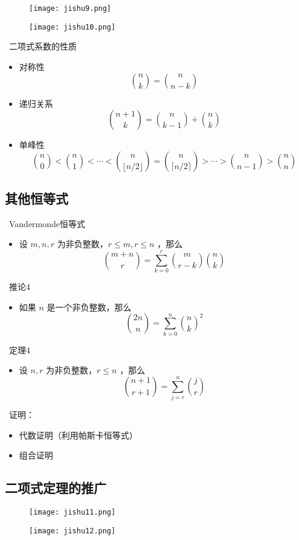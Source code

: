 \documentclass[UTF8]{report}
\theoremstyle{MyLineTheoremStyle} %
\theoremstyle{MyBlockTheoremStyle} %
\theoremstyle{MySubsubsectionStyle} %
\begin{document}
\begin{figure}[H]
    \centering
    \texttt{[image: jishu9.png]}
\end{figure}

\begin{figure}[H]
    \centering
    \texttt{[image: jishu10.png]}
\end{figure}

\textbullet\ 二项式系数的性质
\begin{itemize}
    \item 对称性
    \[
    \binom{n}{k} = \binom{n}{n - k}
    \]
    \item 递归关系
    \[
    \binom{n+1}{k} = \binom{n}{k-1} + \binom{n}{k}
    \]
    \item 单峰性
    \[
    \binom{n}{0} < \binom{n}{1} < \cdots < \binom{n}{\lfloor n/2 \rfloor} = \binom{n}{\lceil n/2 \rceil} > \cdots > \binom{n}{n-1} > \binom{n}{n}
    \]
\end{itemize}

\subsection{其他恒等式}
\textbullet\ Vandermonde恒等式
\begin{itemize}
    \item 设 $m, n, r$ 为非负整数，$r \leq m, r \leq n$ ，那么
    \[
    \binom{m+n}{r} = \sum_{k=0}^{r} \binom{m}{r-k} \binom{n}{k}
    \]
\end{itemize}

\textbullet\ 推论4
\begin{itemize}
    \item 如果 $n$ 是一个非负整数，那么
    \[
    \binom{2n}{n} = \sum_{k=0}^{n} \binom{n}{k}^2
    \]
\end{itemize}

\textbullet\ 定理4
\begin{itemize}
    \item 设 $n, r$ 为非负整数，$r \leq n$ ，那么
    \[
    \binom{n+1}{r+1} = \sum_{j=r}^{n} \binom{j}{r}
    \]
\end{itemize}

\textbullet\ 证明：
\begin{itemize}
    \item 代数证明（利用帕斯卡恒等式）
    \item 组合证明
\end{itemize}

\subsection{二项式定理的推广}

\begin{figure}[H]
    \centering
    \texttt{[image: jishu11.png]}
\end{figure}

\begin{figure}[H]
    \centering
    \texttt{[image: jishu12.png]}
\end{figure}
\end{document}
